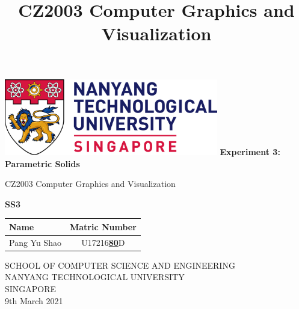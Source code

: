 \documentclass[acmlarge,nonacm=true]{acmart}
\begin{document}
	
	\begin{titlepage}
		\begin{center}
			\vspace*{1cm}
			\includegraphics[width=0.7\textwidth]{fig/ntu_logo}
			\vspace{0.8cm}
			\linebreak
			\Huge
			\textbf{Experiment 3: Parametric Solids}
			
			\vspace{0.5cm}
			\LARGE
			CZ2003 Computer Graphics and Visualization
			
			\vspace{1.5cm}
			\textbf{SS3}\\
			
			\begin{table}[h]
				\begin{tabular}{lc}
					Name & Matric Number \\\hline
					Pang Yu Shao & U17216\underline{\textbf{80}}D \\
				\end{tabular}
			\end{table}
			
			
			
			\vfill
			
			\vspace{0.8cm}
			
			
			
			\Large
			SCHOOL OF COMPUTER SCIENCE AND ENGINEERING\\
			NANYANG TECHNOLOGICAL UNIVERSITY\\
			SINGAPORE\\
			9th March 2021
			
		\end{center}
	\end{titlepage}

 

\title{CZ2003 Computer Graphics and Visualization}

\end{document}
